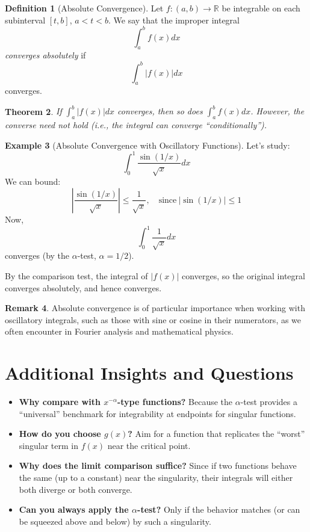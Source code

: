 \documentclass[12pt]{article}
\newtheorem{theorem}{Theorem}[section]
\theoremstyle{definition}
\newtheorem{definition}[theorem]{Definition}
\newtheorem{example}[theorem]{Example}
\newtheorem{remark}[theorem]{Remark}
\begin{document}
\begin{definition}[Absolute Convergence]
Let $f: (a, b) \to \mathbb{R}$ be integrable on each subinterval $[t, b]$, $a < t < b$. We say that the improper integral
\[
\int_a^b f(x) dx
\]
\emph{converges absolutely} if
\[
\int_a^b |f(x)| dx
\]
converges.
\end{definition}

\begin{theorem}
If $\int_a^b |f(x)| dx$ converges, then so does $\int_a^b f(x) dx$. However, the converse need not hold (i.e., the integral can converge ``conditionally'').
\end{theorem}

\vspace{0.2cm}

\begin{example}[Absolute Convergence with Oscillatory Functions]
Let’s study:
\[
\int_0^1 \frac{\sin(1/x)}{\sqrt{x}} dx
\]
We can bound:
\[
\left| \frac{\sin(1/x)}{\sqrt{x}} \right| \leq \frac{1}{\sqrt{x}}, \quad \text{since}\ |\sin(1/x)| \leq 1
\]
Now,
\[
\int_0^1 \frac{1}{\sqrt{x}} dx
\]
converges (by the $\alpha$-test, $\alpha = 1/2$).

By the comparison test, the integral of $|f(x)|$ converges, so the original integral converges absolutely, and hence converges.
\end{example}

\vspace{0.3cm}

\begin{remark}
Absolute convergence is of particular importance when working with oscillatory integrals, such as those with sine or cosine in their numerators, as we often encounter in Fourier analysis and mathematical physics.
\end{remark}

\vspace{0.3cm}

\section{Additional Insights and Questions}

\begin{itemize}
    \item \textbf{Why compare with $x^{-\alpha}$-type functions?} Because the $\alpha$-test provides a ``universal'' benchmark for integrability at endpoints for singular functions.
    \item \textbf{How do you choose $g(x)$?} Aim for a function that replicates the ``worst'' singular term in $f(x)$ near the critical point.
    \item \textbf{Why does the limit comparison suffice?} Since if two functions behave the same (up to a constant) near the singularity, their integrals will either both diverge or both converge.
    \item \textbf{Can you always apply the $\alpha$-test?} Only if the behavior matches (or can be squeezed above and below) by such a singularity.
\end{itemize}
\end{document}
